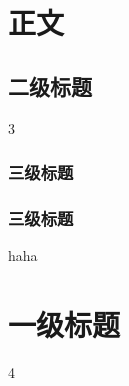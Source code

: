 ﻿\chapter{正文}
\section{二级标题}
 3
\subsection{三级标题}
\subsection{三级标题}
 h\citep{aBook}aha\citep{b2}
\chapter{一级标题}
4
